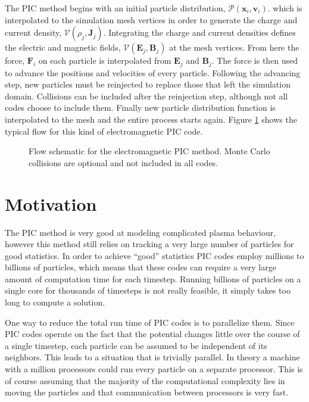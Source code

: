 The PIC method begins with an initial particle distribution, $\mathcal{P}(\mathbf{x}_i,\mathbf{v}_i)$. which is interpolated to the simulation mesh vertices in order to generate the charge and current density, $\mathcal{V}(\rho_j,\mathbf{J}_j)$. Integrating the charge and current densities defines the electric and magnetic fields, $\mathcal{V}(\mathbf{E}_j,\mathbf{B}_j)$ at the mesh vertices. From here the force, $\mathbf{F}_i$ on each particle is interpolated from $\mathbf{E}_j$ and $\mathbf{B}_j$. The force is then used to advance the positions and velocities of every particle. Following the advancing step, new particles must be reinjected to replace those that left the simulation domain. Collisions can be included after the reinjection step, although not all codes choose to include them. Finally new particle distribution function is interpolated to the mesh and the entire process starts again. Figure \ref{fig:pic_flowchart} shows the typical flow for this kind of electromagnetic PIC code.\cite{Verboncoeur2005}
\begin{figure}
\begin{center}

\end{center}
\caption[Flow schematic for the PIC method.]{Flow schematic for the electromagnetic PIC method. Monte Carlo collisions are optional and not included in all codes.}
\label{fig:pic_flowchart}
\end{figure}


	\section{Motivation}

	The PIC method is very good at modeling complicated plasma behaviour, however this method still relies on tracking a very large number of particles for good statistics. In order to achieve ``good'' statistics PIC codes employ millions to billions of particles, which means that these codes can require a very large amount of computation time for each timestep. Running billions of particles on a single core for thousands of timesteps is not really feasible, it simply takes too long to compute a solution. 
	
	One way to reduce the total run time of PIC codes is to parallelize them. Since PIC codes operate on the fact that the potential changes little over the course of a single timestep, each particle can be assumed to be independent of its neighbors. This leads to a situation that is trivially parallel. In theory a machine with a million processors could run every particle on a separate processor. This is of course assuming that the majority of the computational complexity lies in moving the particles and that communication between processors is very fast.  


